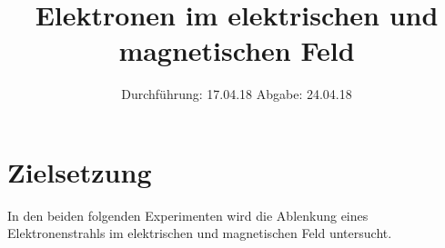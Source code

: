 

\subject{V501/V502}
\title{Elektronen im elektrischen und magnetischen Feld}
\date{%
  Durchführung: 17.04.18
  \hspace{3em}
  Abgabe: 24.04.18
}



\maketitle
\thispagestyle{empty}
\tableofcontents
\newpage

\section{Zielsetzung}
\label{sec:Zielsetzung}

In den beiden folgenden Experimenten wird die Ablenkung eines Elektronenstrahls im elektrischen und magnetischen Feld untersucht.







\printbibliography{}


